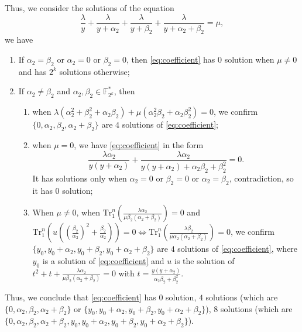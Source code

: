 \documentclass[runningheads,a4paper]{article}
\newcommand{\F}{\mathbb{F}}
\newcommand{\0}{\textbf{0}}
\newcommand{\1}{\textbf{1}}
\renewcommand{\Tr}{\mathrm{Tr}_1^n}
\begin{document}
    Thus, we consider the solutions of the equation 
    \begin{equation}\label{eq:coefficient}
        \frac{\lambda}{y}+\frac{\lambda}{y+\alpha_2}+\frac{\lambda}{y+\beta_2}+\frac{\lambda}{y+\alpha_2+\beta_2}=\mu,
    \end{equation}  
    we have 
    \begin{enumerate}[label=(\arabic{*})]
        \item If $ \alpha_2=\beta_2 $ or $ \alpha_2=0 $ or $ \beta_2=0 $, then \eqref{eq:coefficient} has $ 0 $ solution when
        $ \mu\ne 0 $ and has $ 2^k $ solutions otherwise;
        \item If $ \alpha_2\ne\beta_2 $ and $ \alpha_2,\beta_2\in\F_{2^k}^* $, then 
        \begin{enumerate}
            \item when $ \lambda(\alpha_2^2+\beta_2^2+\alpha_2\beta_2)+\mu(\alpha_2^2\beta_2+\alpha_2\beta_2^2)=0 $, 
            we confirm $ \{0,\alpha_2,\beta_2,\alpha_2+\beta_2\} $ are $ 4 $ solutions of \eqref{eq:coefficient};
            \item when $ \mu=0 $, we have \eqref{eq:coefficient} in the form 
            \[\frac{\lambda\alpha_2}{y(y+\alpha_2)}+\frac{\lambda\alpha_2}{y(y+\alpha_2)+\alpha_2\beta_2+\beta_2^2}=0.\]
            It has solutions only when $ \alpha_2=0 $ or $ \beta_2=0 $ or $ \alpha_2=\beta_2 $, contradiction, so it has 
            $ 0 $ solution;
            \item When $ \mu\ne 0 $, when $ \Tr\left(\frac{\lambda\alpha_2}{\mu\beta_2(\alpha_2+\beta_2)}\right)=0 $ and 
            $ \Tr\left(u\left(\left(\frac{\beta_2}{\alpha_2}\right)^2+\frac{\beta_2}{\alpha_2}\right)\right)=0\Leftrightarrow\Tr\left(\frac{\lambda\beta_2}{\mu\alpha_2(\alpha_2+\beta_2)}\right)=0 $, 
            we confirm $ \{y_0,y_0+\alpha_2,y_0+\beta_2,y_0+\alpha_2+\beta_2\} $ are $ 4 $ solutions of \eqref{eq:coefficient}, 
            where $ y_0 $ is a solution of \eqref{eq:coefficient} and 
            $ u $ is the solution of $ t^2+t+\frac{\lambda\alpha_2}{\mu\beta_2(\alpha_2+\beta_2)}=0 $ 
            with $ t=\frac{y(y+\alpha_2)}{\alpha_2\beta_2+\beta_2^2} $.
        \end{enumerate}
    \end{enumerate} 
    Thus, we conclude that \eqref{eq:coefficient} has $ 0 $ solution, 
    $ 4 $ solutions (which are $ \{0,\alpha_2,\beta_2,\alpha_2+\beta_2\} $ or $\{y_0,y_0+\alpha_2,y_0+\beta_2,y_0+\alpha_2+\beta_2\} $), 
    $ 8 $ solutions (which are $ \{0,\alpha_2,\beta_2,\alpha_2+\beta_2,y_0,y_0+\alpha_2,y_0+\beta_2,y_0+\alpha_2+\beta_2\} $).
\end{document}
